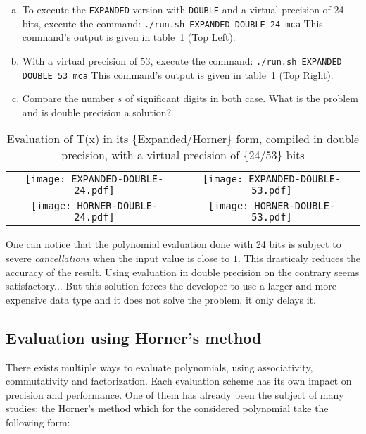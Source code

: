 \begin{question}
\begin{enumerate}[(a)]
\item To execute the {\tt EXPANDED} version with {\tt DOUBLE} and a virtual precision of 24 bits, execute the command: {\tt ./run.sh EXPANDED
      DOUBLE 24 mca} \newline This command's output is given in table~\ref{fig:exp_hor_24_53} (Top Left).
  \item With a virtual precision of 53, execute the command: {\tt ./run.sh EXPANDED DOUBLE 53 mca} \newline
  This command's output is given in table~\ref{fig:exp_hor_24_53} (Top Right).
  \item Compare the number $s$ of significant digits in both case. What is the problem and is double precision a solution?
  \end{enumerate}
\end{question}

\begin{table}
\begin{tabular}{cc}
\texttt{[image: EXPANDED-DOUBLE-24.pdf]} &
\texttt{[image: EXPANDED-DOUBLE-53.pdf]} \\
\texttt{[image: HORNER-DOUBLE-24.pdf]} &
\texttt{[image: HORNER-DOUBLE-53.pdf]} \\
\end{tabular}
  \caption{Evaluation of T(x) in its \{Expanded/Horner\} form, compiled in double precision, with a virtual precision of \{24/53\} bits}
  \label{fig:exp_hor_24_53}
\end{table}


One can notice that the polynomial evaluation done with 24 bits is subject to severe {\it cancellations} when the input value is close to $1$.
This drasticaly reduces the accuracy of the result.
Using evaluation in double precision on the contrary seems satisfactory...
But this solution forces the developer to use a larger and more expensive data type and it does not solve the problem, it only delays it.

\FloatBarrier

\subsection{Evaluation using Horner's method}
There exists multiple ways to evaluate polynomials, using associativity, commutativity and factorization.
Each evaluation scheme has its own impact on precision and performance.
One of them has already been the subject of many studies: the Horner's method which for the considered polynomial take the following form:

